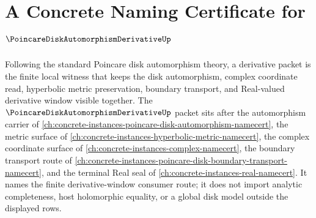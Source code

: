 \chapter{A Concrete Naming Certificate for $\PoincareDiskAutomorphismDerivativeUp$}
\label{ch:concrete-instances-poincare-disk-automorphism-derivative-namecert}

Following the standard Poincare disk automorphism theory, a derivative packet is the finite local witness that keeps the disk automorphism, complex coordinate read, hyperbolic metric preservation, boundary transport, and Real-valued derivative window visible together. The $\PoincareDiskAutomorphismDerivativeUp$ packet sits after the automorphism carrier of \autoref{ch:concrete-instances-poincare-disk-automorphism-namecert}, the metric surface of \autoref{ch:concrete-instances-hyperbolic-metric-namecert}, the complex coordinate surface of \autoref{ch:concrete-instances-complex-namecert}, the boundary transport route of \autoref{ch:concrete-instances-poincare-disk-boundary-transport-namecert}, and the terminal Real seal of \autoref{ch:concrete-instances-real-namecert}. It names the finite derivative-window consumer route; it does not import analytic completeness, host holomorphic equality, or a global disk model outside the displayed rows.

